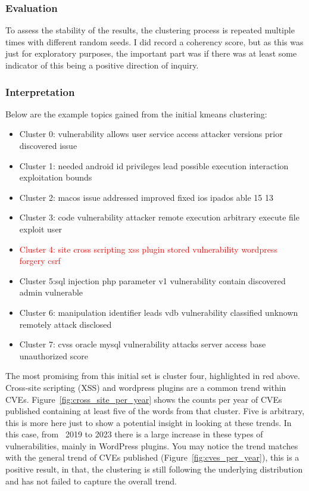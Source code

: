 \documentclass[12pt]{article}
\begin{document}
\subsubsection*{Evaluation}


To assess the stability of the results, the clustering process is repeated multiple times
with different random seeds. I did record a coherency score, but as this was just for exploratory
purposes, the important part was if there was at least some indicator of this being a positive
direction of inquiry.


\subsubsection*{Interpretation}

Below are the example topics gained from the initial kmeans clustering:
\begin{itemize}

	\item Cluster 0: vulnerability allows user service access attacker versions prior discovered issue

	\item Cluster 1: needed android id privileges lead possible execution interaction exploitation bounds

	\item Cluster 2: macos issue addressed improved fixed ios ipados able 15 13

	\item Cluster 3: code vulnerability attacker remote execution arbitrary execute file exploit user

	\item \textcolor{red}{Cluster 4: site cross scripting xss plugin stored vulnerability wordpress
		      forgery csrf}

	\item Cluster 5:sql injection php parameter v1 vulnerability contain discovered
	      admin vulnerable

	\item Cluster 6: manipulation identifier leads vdb vulnerability classified unknown remotely attack disclosed

	\item Cluster 7: cvss oracle mysql vulnerability attacks server access base unauthorized score
\end{itemize}

The most promising from this initial set is cluster four, highlighted in red above. Cross-site
scripting (XSS) and wordpress plugins are a common trend within CVEs.
Figure~\ref{fig:cross_site_per_year} shows the counts per year of CVEs published containing at least five of the
words from that cluster. Five is arbitrary, this is more here just to show a potential insight in
looking at these trends. In this case, from ~2019 to 2023 there is a large increase in these types
of vulnerabilities, mainly in WordPress plugins. You may notice the trend matches with the general
trend of CVEs published (Figure~\ref{fig:cves_per_year}), this is a positive result, in that, the clustering
is still following the underlying distribution and has not failed to capture the overall trend.
\end{document}

